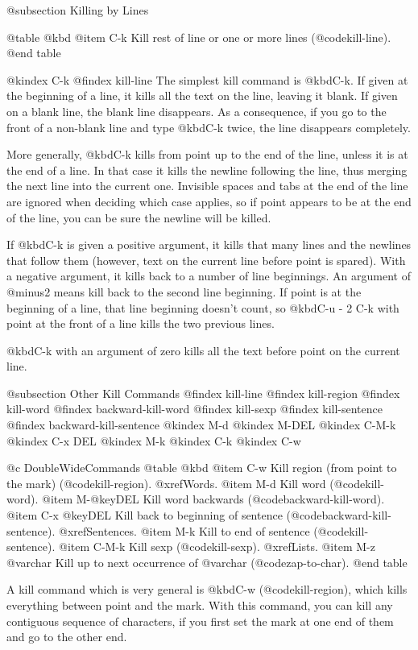 {{{{{{{{@subsection Killing by Lines

@table @kbd
@item C-k
Kill rest of line or one or more lines (@code{kill-line}).
@end table

@kindex C-k
@findex kill-line
  The simplest kill command is @kbd{C-k}.  If given at the beginning of a
line, it kills all the text on the line, leaving it blank.  If given on a
blank line, the blank line disappears.  As a consequence, if you go to the
front of a non-blank line and type @kbd{C-k} twice, the line disappears
completely.

  More generally, @kbd{C-k} kills from point up to the end of the line,
unless it is at the end of a line.  In that case it kills the newline
following the line, thus merging the next line into the current one.
Invisible spaces and tabs at the end of the line are ignored when deciding
which case applies, so if point appears to be at the end of the line, you
can be sure the newline will be killed.

  If @kbd{C-k} is given a positive argument, it kills that many lines and
the newlines that follow them (however, text on the current line before
point is spared).  With a negative argument, it kills back to a number of
line beginnings.  An argument of @minus{}2 means kill back to the second line
beginning.  If point is at the beginning of a line, that line beginning
doesn't count, so @kbd{C-u - 2 C-k} with point at the front of a line kills
the two previous lines.

  @kbd{C-k} with an argument of zero kills all the text before point on the
current line.

@subsection Other Kill Commands
@findex kill-line
@findex kill-region
@findex kill-word
@findex backward-kill-word
@findex kill-sexp
@findex kill-sentence
@findex backward-kill-sentence
@kindex M-d
@kindex M-DEL
@kindex C-M-k
@kindex C-x DEL
@kindex M-k
@kindex C-k
@kindex C-w

@c DoubleWideCommands
@table @kbd
@item C-w
Kill region (from point to the mark) (@code{kill-region}).
@xref{Words}.
@item M-d
Kill word (@code{kill-word}).
@item M-@key{DEL}
Kill word backwards (@code{backward-kill-word}).
@item C-x @key{DEL}
Kill back to beginning of sentence (@code{backward-kill-sentence}).
@xref{Sentences}.
@item M-k
Kill to end of sentence (@code{kill-sentence}).
@item C-M-k
Kill sexp (@code{kill-sexp}).  @xref{Lists}.
@item M-z @var{char}
Kill up to next occurrence of @var{char} (@code{zap-to-char}).
@end table

  A kill command which is very general is @kbd{C-w} (@code{kill-region}),
which kills everything between point and the mark.  With this command, you
can kill any contiguous sequence of characters, if you first set the mark
at one end of them and go to the other end.

}}}}}}}}
